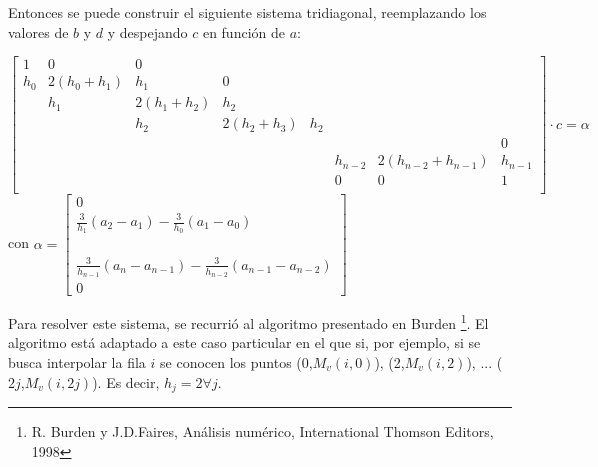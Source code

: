 \documentclass[a4paper]{article}
\begin{document}
Entonces se puede construir el siguiente sistema tridiagonal, reemplazando los valores de $b$ y $d$ y despejando $c$ en función de $a$:
\begin{center}
$\begin{bmatrix}
1   &0  &0  &   &   &   &   &   \\
h_0 &2(h_0+h_1) &h_1&0  &   &   &   &   \\
    &h_1&2(h_1+h_2) &h_2&   &   &   &   \\
    &   &h_2&2(h_2+h_3) &h_2&   &   &   \\
    &   &   &   &   &   &   &0  \\
    &   &   &   &   &h_{n-2}&2(h_{n-2}+h_{n-1})&h_{n-1}\\
    &   &   &   &   &  0&  0&1  \\
\end{bmatrix}
\cdot c = \alpha$
con $\alpha=\begin{bmatrix} 0\\ \frac{3}{h_1}(a_2-a_1)-\frac{3}{h_0}(a_1-a_0)\\ \\ \\ \\\frac{3}{h_{n-1}}(a_n-a_{n-1})-\frac{3}{h_{n-2}}(a_{n-1}-a_{n-2}) \\0 \end{bmatrix}$
\end{center}

Para resolver este sistema, se recurrió al algoritmo presentado en Burden \footnote{R. Burden y J.D.Faires, Análisis numérico, International Thomson Editors, 1998}. El algoritmo está adaptado a este caso particular en el que si, por ejemplo, si se busca interpolar la fila $i$ se conocen los puntos (0,$M_v(i,0)$), (2,$M_v(i,2)$), ... ($2j$,$M_v(i,2j)$). Es decir, $h_j=2 \forall j$.
\end{document}
